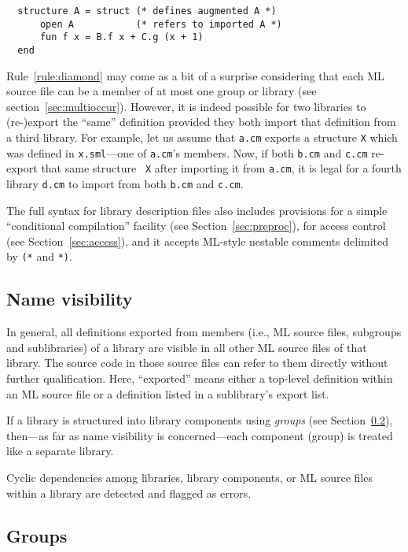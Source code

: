 \documentclass[titlepage,letterpaper]{article}
\begin{document}
\begin{verbatim}
  structure A = struct (* defines augmented A *)
      open A           (* refers to imported A *)
      fun f x = B.f x + C.g (x + 1)
  end
\end{verbatim}

Rule~\ref{rule:diamond} may come as a bit of a surprise considering
that each ML source file can be a member of at most one group or
library (see section~\ref{sec:multioccur}).  However, it is indeed
possible for two libraries to (re-)export the ``same'' definition
provided they both import that definition from a third library.  For
example, let us assume that {\tt a.cm} exports a structure {\tt X}
which was defined in {\tt x.sml}---one of {\tt a.cm}'s members.  Now,
if both {\tt b.cm} and {\tt c.cm} re-export that same structure {\tt
X} after importing it from {\tt a.cm}, it is legal for a fourth
library {\tt d.cm} to import from both {\tt b.cm} and {\tt c.cm}.

The full syntax for library description files also includes provisions
for a simple ``conditional compilation'' facility (see
Section~\ref{sec:preproc}), for access control (see
Section~\ref{sec:access}), and it accepts ML-style nestable comments
delimited by \verb|(*| and \verb|*)|.

\subsection{Name visibility}

In general, all definitions exported from members (i.e., ML source
files, subgroups and sublibraries) of a library are visible in all
other ML source files of that library.  The source code in those
source files can refer to them directly without further qualification.
Here, ``exported'' means either a top-level definition within an ML
source file or a definition listed in a sublibrary's export list.

If a library is structured into library components using {\em groups}
(see Section~\ref{sec:groups}), then---as far as name visibility is
concerned---each component (group) is treated like a separate library.

Cyclic dependencies among libraries, library components, or ML source
files within a library are detected and flagged as errors.

\subsection{Groups}
\label{sec:groups}
\end{document}
